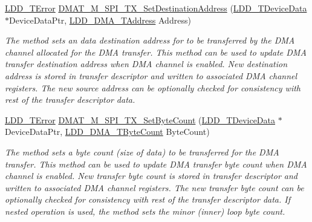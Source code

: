 \begin{DoxyCompactItemize}
\hyperlink{group___p_e___types__module_ga24c2b045fd04e79e85f261ce4df35588}{L\-D\-D\-\_\-\-T\-Error} \hyperlink{group___d_m_a_t___m___s_p_i___t_x__module_ga1a33c0a3ee3c52e3eb70c340bdb55ead}{D\-M\-A\-T\-\_\-\-M\-\_\-\-S\-P\-I\-\_\-\-T\-X\-\_\-\-Set\-Destination\-Address} (\hyperlink{group___p_e___types__module_gac5cf1362f1f0e3a2ce71b1bf2276d091}{L\-D\-D\-\_\-\-T\-Device\-Data} $\ast$Device\-Data\-Ptr, \hyperlink{group___p_e___types__module_gab8287f62db7ff96992355760b652cd07}{L\-D\-D\-\_\-\-D\-M\-A\-\_\-\-T\-Address} Address)
\begin{DoxyCompactList}\small\item\em The method sets an data destination address for to be transferred by the D\-M\-A channel allocated for the D\-M\-A transfer. This method can be used to update D\-M\-A transfer destination address when D\-M\-A channel is enabled. New destination address is stored in transfer descriptor and written to associated D\-M\-A channel registers. The new source address can be optionally checked for consistency with rest of the transfer descriptor data. \end{DoxyCompactList}\item 
\hyperlink{group___p_e___types__module_ga24c2b045fd04e79e85f261ce4df35588}{L\-D\-D\-\_\-\-T\-Error} \hyperlink{group___d_m_a_t___m___s_p_i___t_x__module_ga84754d3ac6e72252b68a19e95a685806}{D\-M\-A\-T\-\_\-\-M\-\_\-\-S\-P\-I\-\_\-\-T\-X\-\_\-\-Set\-Byte\-Count} (\hyperlink{group___p_e___types__module_gac5cf1362f1f0e3a2ce71b1bf2276d091}{L\-D\-D\-\_\-\-T\-Device\-Data} $\ast$Device\-Data\-Ptr, \hyperlink{group___p_e___types__module_gac001a681eb67942fa78ac9b62ba3b0d6}{L\-D\-D\-\_\-\-D\-M\-A\-\_\-\-T\-Byte\-Count} Byte\-Count)
\begin{DoxyCompactList}\small\item\em The method sets a byte count (size of data) to be transferred for the D\-M\-A transfer. This method can be used to update D\-M\-A transfer byte count when D\-M\-A channel is enabled. New transfer byte count is stored in transfer descriptor and written to associated D\-M\-A channel registers. The new transfer byte count can be optionally checked for consistency with rest of the transfer descriptor data. If nested operation is used, the method sets the minor (inner) loop byte count. \end{DoxyCompactList}\end{DoxyCompactItemize}
